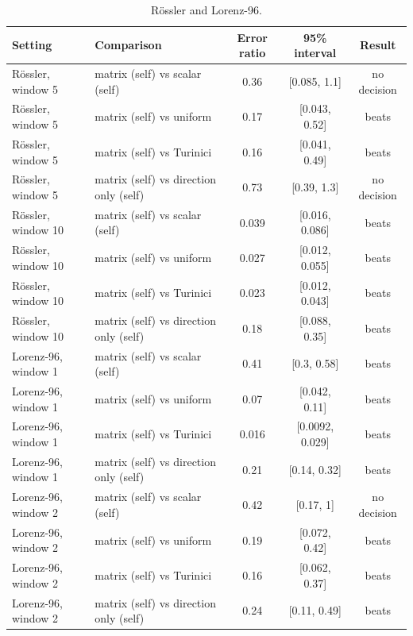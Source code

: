 \begin{table}[H]\centering\small
\caption{Rössler and Lorenz-96.}
\begin{tabular}{llccc}\toprule
Setting & Comparison & Error ratio & 95\% interval & Result\\\midrule
Rössler, window 5 & matrix (self) vs scalar (self) & 0.36 & [0.085, 1.1] & no decision\\
Rössler, window 5 & matrix (self) vs uniform & 0.17 & [0.043, 0.52] & beats\\
Rössler, window 5 & matrix (self) vs Turinici & 0.16 & [0.041, 0.49] & beats\\
Rössler, window 5 & matrix (self) vs direction only (self) & 0.73 & [0.39, 1.3] & no decision\\
Rössler, window 10 & matrix (self) vs scalar (self) & 0.039 & [0.016, 0.086] & beats\\
Rössler, window 10 & matrix (self) vs uniform & 0.027 & [0.012, 0.055] & beats\\
Rössler, window 10 & matrix (self) vs Turinici & 0.023 & [0.012, 0.043] & beats\\
Rössler, window 10 & matrix (self) vs direction only (self) & 0.18 & [0.088, 0.35] & beats\\
Lorenz-96, window 1 & matrix (self) vs scalar (self) & 0.41 & [0.3, 0.58] & beats\\
Lorenz-96, window 1 & matrix (self) vs uniform & 0.07 & [0.042, 0.11] & beats\\
Lorenz-96, window 1 & matrix (self) vs Turinici & 0.016 & [0.0092, 0.029] & beats\\
Lorenz-96, window 1 & matrix (self) vs direction only (self) & 0.21 & [0.14, 0.32] & beats\\
Lorenz-96, window 2 & matrix (self) vs scalar (self) & 0.42 & [0.17, 1] & no decision\\
Lorenz-96, window 2 & matrix (self) vs uniform & 0.19 & [0.072, 0.42] & beats\\
Lorenz-96, window 2 & matrix (self) vs Turinici & 0.16 & [0.062, 0.37] & beats\\
Lorenz-96, window 2 & matrix (self) vs direction only (self) & 0.24 & [0.11, 0.49] & beats\\
\bottomrule\end{tabular}\end{table}

